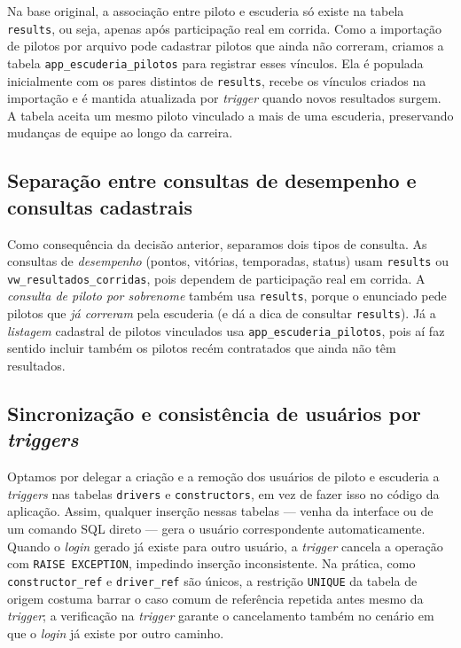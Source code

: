 \documentclass[12pt,a4paper]{article}
\begin{document}
Na base original, a associação entre piloto e escuderia só existe na tabela \texttt{results}, ou seja, apenas após participação real em corrida. Como a importação de pilotos por arquivo pode cadastrar pilotos que ainda não correram, criamos a tabela \texttt{app\_escuderia\_pilotos} para registrar esses vínculos. Ela é populada inicialmente com os pares distintos de \texttt{results}, recebe os vínculos criados na importação e é mantida atualizada por \textit{trigger} quando novos resultados surgem. A tabela aceita um mesmo piloto vinculado a mais de uma escuderia, preservando mudanças de equipe ao longo da carreira.

\subsection{Separação entre consultas de desempenho e consultas cadastrais}

Como consequência da decisão anterior, separamos dois tipos de consulta. As consultas de \emph{desempenho} (pontos, vitórias, temporadas, status) usam \texttt{results} ou \texttt{vw\_resultados\_corridas}, pois dependem de participação real em corrida. A \emph{consulta de piloto por sobrenome} também usa \texttt{results}, porque o enunciado pede pilotos que \emph{já correram} pela escuderia (e dá a dica de consultar \texttt{results}). Já a \emph{listagem} cadastral de pilotos vinculados usa \texttt{app\_escuderia\_pilotos}, pois aí faz sentido incluir também os pilotos recém contratados que ainda não têm resultados.

\subsection{Sincronização e consistência de usuários por \textit{triggers}}

Optamos por delegar a criação e a remoção dos usuários de piloto e escuderia a \textit{triggers} nas tabelas \texttt{drivers} e \texttt{constructors}, em vez de fazer isso no código da aplicação. Assim, qualquer inserção nessas tabelas --- venha da interface ou de um comando SQL direto --- gera o usuário correspondente automaticamente. Quando o \textit{login} gerado já existe para outro usuário, a \textit{trigger} cancela a operação com \texttt{RAISE EXCEPTION}, impedindo inserção inconsistente. Na prática, como \texttt{constructor\_ref} e \texttt{driver\_ref} são únicos, a restrição \texttt{UNIQUE} da tabela de origem costuma barrar o caso comum de referência repetida antes mesmo da \textit{trigger}; a verificação na \textit{trigger} garante o cancelamento também no cenário em que o \textit{login} já existe por outro caminho.
\end{document}
